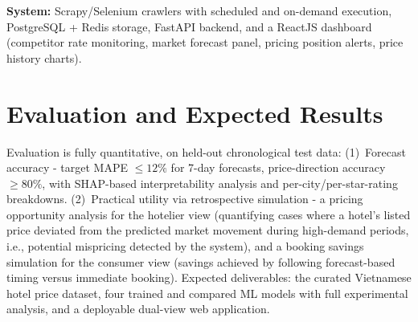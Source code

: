 \documentclass[11pt,a4paper]{article}
\newcommand{\entry}[1]{\par\hspace*{1.5em}#1}
\begin{document}
\entry{\textbf{System:} Scrapy/Selenium crawlers with scheduled and on-demand
execution, PostgreSQL + Redis storage, FastAPI backend, and a ReactJS
dashboard (competitor rate monitoring, market forecast panel, pricing
position alerts, price history charts).}

\section{Evaluation and Expected Results}
Evaluation is fully quantitative, on held-out chronological test data:
(1)~Forecast accuracy - target MAPE $\leq 12\%$ for 7-day forecasts,
price-direction accuracy $\geq 80\%$, with SHAP-based interpretability
analysis and per-city/per-star-rating breakdowns. (2)~Practical utility via
retrospective simulation - a pricing opportunity analysis for the hotelier
view (quantifying cases where a hotel's listed price deviated from the
predicted market movement during high-demand periods, i.e., potential
mispricing detected by the system), and a booking savings simulation for the
consumer view (savings achieved by following forecast-based timing versus
immediate booking). Expected deliverables: the curated Vietnamese hotel
price dataset, four trained and compared ML models with full experimental
analysis, and a deployable dual-view web application.
\end{document}
